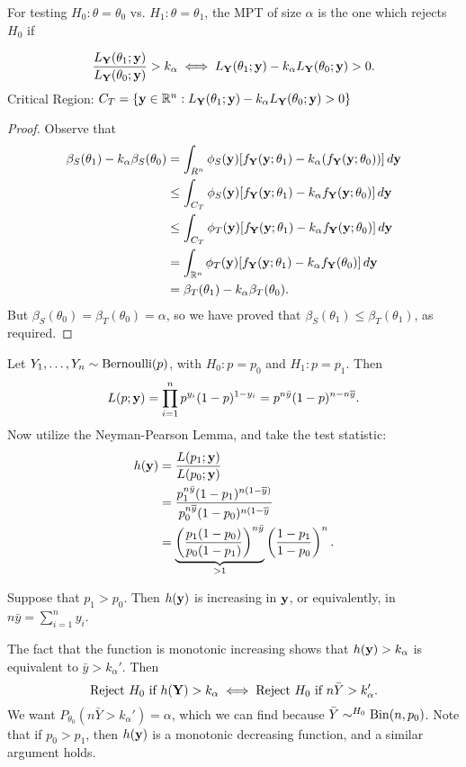 \begin{lemma}
For testing $H_0:\theta=\theta_0$ vs. $H_1:\theta=\theta_1$, the MPT of size  $\alpha$ is the one which rejects $H_0$ if

\[
	\frac{L_\mathbf Y(\theta_1;\mathbf y)}{L_\mathbf Y(\theta_0;\mathbf y)}>k_\alpha \;\Longleftrightarrow\; L_\mathbf Y(\theta_1;\mathbf y)-k_\alpha L_\mathbf Y(\theta_0;\mathbf y)>0
.\] 
Critical Region: $C_T=\{\mathbf y \in \mathbb R^n:L_\mathbf Y(\theta_1;\mathbf y)-k_\alpha L_\mathbf Y(\theta_0;\mathbf y)>0\}$
\end{lemma}
\begin{proof}
	Observe that
\begin{align*}
    \beta_S(\theta_1)-k_\alpha\beta_S(\theta_0)&= \int_{R^n} \phi_S(\mathbf y)[f_\mathbf Y(\mathbf y;\theta_1)-k_\alpha(f_\mathbf Y(\mathbf y;\theta_0))]\, d\mathbf y\\
		      &\leq \int_{C_T} \phi_S(\mathbf y)[f_\mathbf Y(\mathbf y;\theta_1)-k_\alpha f_\mathbf Y(\mathbf y;\theta_0)]\, d\mathbf y \\
		      &\leq \int_{C_T} \phi_T(\mathbf y)[f_\mathbf Y(\mathbf y;\theta_1)-k_\alpha f_\mathbf Y(\mathbf y;\theta_0)] \, d\mathbf y \\
		      &= \int_{\mathbb R^n}\phi_T(\mathbf y)[f_\mathbf Y(\mathbf y;\theta_1)-k_\alpha f_\mathbf Y(\theta_0)] \, d \mathbf y \\
		      &= \beta_T(\theta_1)-k_\alpha\beta_T(\theta_0)
	.\end{align*}
But $\beta_S(\theta_0)=\beta_T(\theta_0)=\alpha$, so we have proved that $\beta_S(\theta_1)\leq \beta_T(\theta_1)$, as required.
\end{proof}


\begin{eg}
	Let $Y_1,\dots,Y_n\sim\operatorname*{Bernoulli}(p)$, with $H_0:p=p_0$ and $H_1:p=p_1$. Then
	\[
		L(p;\mathbf y)=\prod^n_{i=1}p^{y_i}(1-p)^{1-y_i}=p^{n \bar{y}}(1-p)^{n-n\overline{y}}
	.\] 
	Now utilize the Neyman-Pearson Lemma, and take the test statistic:
	\begin{align*}
		h(\mathbf y)&=\frac{L(p_1;\mathbf y)}{L(p_0;\mathbf y)} \\
		      &= \frac{p_1^{n\bar{y}}(1-p_1)^{n(1-\overline{y})}}{p_0^{n\overline{y}}(1-p_0)^{n(1-\overline{y}}} \\
		      &= \underbrace{\left( \frac{p_1(1-p_0)}{p_0(1-p_1)} \right)^{n\bar{y}}}_{>1}\left( \frac{1-p_1}{1-p_0} \right) ^n
	.\end{align*}
\end{eg}
Suppose that $p_1>p_0$. Then $h(\mathbf y)$ is increasing in $\mathbf y$, or equivalently, in $n\bar{y}=\sum^n_{i=1}y_i$.


The fact that the function is monotonic increasing shows that $h(\mathbf y)>k_\alpha$ is equivalent to $\bar{y}>k_\alpha'$. Then
\[
\text{Reject $H_0$ if } h(\mathbf Y)>k_\alpha \;\Longleftrightarrow\; \text{Reject $H_0$ if } n\bar{Y}>k_\alpha'
.\] 
We want $P_{\theta_0}(n\bar{Y}>k_\alpha')=\alpha$, which we can find because $\bar{Y}\sim^{H_0} \operatorname*{Bin}(n,p_0)$. Note that if $p_0>p_1$, then $h(\mathbf y)$ is a monotonic decreasing function, and a similar argument holds. 

